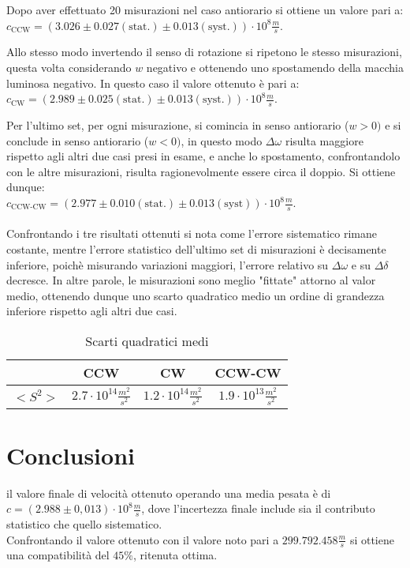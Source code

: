 \documentclass{article}
\begin{document}
Dopo aver effettuato 20 misurazioni nel caso antiorario si ottiene un valore pari a: \\
\(c_\text{CCW}=(3.026\pm 0.027 (\text{stat.}) \pm 0.013(\text{syst.}))\cdot 10^8 \frac{m}{s}\).

Allo stesso modo invertendo il senso di rotazione si ripetono le stesso misurazioni, questa volta considerando \(w\) negativo e ottenendo uno spostamendo della macchia luminosa negativo. In questo caso il valore ottenuto è pari a: \\
\(c_\text{CW}=(2.989\pm 0.025 (\text{stat.}) \pm 0.013(\text{syst.}))\cdot 10^8 \frac{m}{s}\).


Per l'ultimo set, per ogni misurazione, si comincia in senso antiorario (\(w>0)\) e si conclude in senso antiorario (\(w<0)\), in questo modo \(\Delta\omega\) risulta maggiore rispetto agli altri due casi presi in esame, e anche lo spostamento, confrontandolo con le altre misurazioni, risulta ragionevolmente essere circa il doppio.
Si ottiene dunque:\\ 
\(c_\text{CCW-CW}=(2.977 \pm 0.010 (\text{stat.}) \pm 0.013 (\text{syst}))\cdot10^8\frac{m}{s}\).\\\\
Confrontando i tre risultati ottenuti si nota come l'errore sistematico rimane costante, mentre l'errore statistico dell'ultimo set di misurazioni è decisamente inferiore, poichè misurando variazioni maggiori, l'errore relativo su \(\Delta\omega\) e su \(\Delta\delta\) decresce. 
In altre parole, le misurazioni sono meglio "fittate" attorno al valor medio, ottenendo dunque uno scarto quadratico medio un ordine di grandezza inferiore rispetto agli altri due casi.

\begin{table}[h]
    \centering
    \begin{tabular}{|c|c|c|c|}
        \hline
       & \textbf{CCW} & \textbf{CW} & \textbf{CCW-CW} \\ \hline
        \(<S^2>\) & \(2.7\cdot 10^{14} \frac{m^2}{s^2}\) & \(1.2\cdot 10^{14}\frac{m^2}{s^2}\)    & \(1.9\cdot 10^{13}\frac{m^2}{s^2}\)                 \\ \hline
        
    \end{tabular}
    \caption{Scarti quadratici medi}
    \label{tab:intestazioni}
\end{table}
\section{Conclusioni}
il valore finale di velocità ottenuto operando una media pesata è di \\
\(c=(2.988\pm0,013)\cdot10^8\frac{m}{s}\), dove l'incertezza finale include sia il contributo statistico che quello sistematico. \\
Confrontando il valore ottenuto con il valore noto pari a \(299.792.458 \frac{m}{s}\) si ottiene una compatibilità del \(45\%\), ritenuta ottima.
\end{document}
